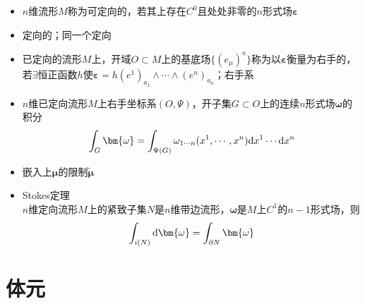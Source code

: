 \begin{itemize}
    \item $n$维流形$M$称为可定向的，若其上存在$C^0$且处处非零的$n$形式场$\bm{\varepsilon}$
    \item 定向的；同一个定向
    \item 已定向的流形$M$上，开域$O \subset M$上的基底场$\{(e_{\mu})^a\}$称为以$\bm{\varepsilon}$衡量为右手的，若$\exists$恒正函数$h$使$\bm{\varepsilon}=h (e^1)_{a_1} \wedge \cdots \wedge (e^n)_{a_n}$；右手系
    \item $n$维已定向流形$M$上右手坐标系$(O,\Psi)$，开子集$G \subset O$上的连续$n$形式场$\bm{\omega}$的积分
    \begin{gather*}
        \int_{G} \bm{\omega}=\int_{\Psi(G)} \omega_{1\cdots n}(x^1,\cdots,x^n) \d x^1 \cdots \d x^n
    \end{gather*}
    \item 嵌入上$\bm{\mu}$的限制$\tilde{\bm{\mu}}$
    \item Stokes定理\\
    $n$维定向流形$M$上的紧致子集$N$是$n$维带边流形，$\bm{\omega}$是$M$上$C^1$的$n-1$形式场，则
    \begin{gather*}
        \int_{i(N)} \d \bm{\omega}=\int_{\partial N} \bm{\omega}
    \end{gather*}
\end{itemize}

\section{体元}

